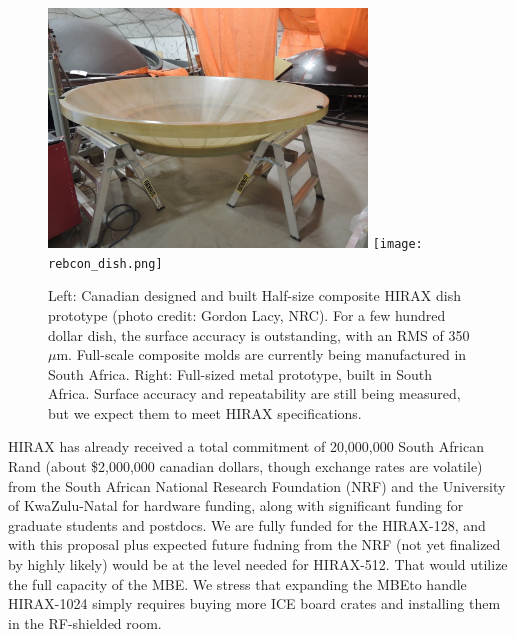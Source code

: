 \documentclass[letterpaper,11pt,preprint]{aastex}
\newcommand{\mbe}{{\rm MBE}}
\begin{document}
\begin{figure}[tbh]
  \includegraphics[height=2.5in]{3m_dish.jpg}
  \texttt{[image: rebcon\_dish.png]}
\caption{\small Left:  Canadian designed and built Half-size composite
  HIRAX dish prototype (photo credit: Gordon Lacy, NRC).  For a few
  hundred dollar dish, the surface accuracy is outstanding, with an
  RMS of 350$\mu$m. Full-scale composite molds are currently being
  manufactured in South Africa.  Right:  Full-sized metal prototype,
  built in South Africa.  Surface accuracy and repeatability are still
  being measured, but we expect them to meet HIRAX specifications.
  \label{fig:hirax_dishes}
}
\end{figure}


HIRAX has already received a total commitment of 20,000,000 South
African Rand (about \$2,000,000 canadian dollars, though exchange
rates are volatile) from the South African National Research
Foundation (NRF) and the University of KwaZulu-Natal for hardware
funding, along with significant funding for graduate students and
postdocs.  We are fully funded for the HIRAX-128, and with this
proposal plus expected future fudning from the NRF (not yet finalized
by highly likely) would be at the level needed for HIRAX-512.  That
would utilize the full capacity of the \mbe.  We stress that expanding
the \mbe to handle HIRAX-1024 simply requires buying more ICE board
crates and installing them in the RF-shielded room.  
\end{document}

